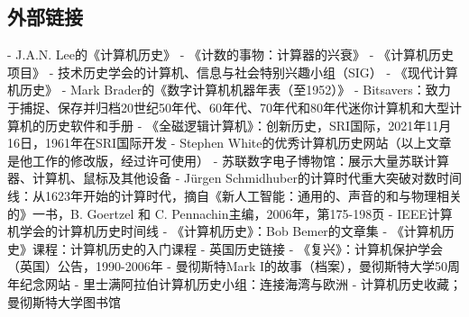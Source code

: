 \subsection{外部链接}
- J.A.N. Lee的《计算机历史》
- 《计数的事物：计算器的兴衰》
- 《计算机历史项目》
- 技术历史学会的计算机、信息与社会特别兴趣小组（SIG）
- 《现代计算机历史》
- Mark Brader的《数字计算机机器年表（至1952）》
- Bitsavers：致力于捕捉、保存并归档20世纪50年代、60年代、70年代和80年代迷你计算机和大型计算机的历史软件和手册
- 《全磁逻辑计算机》：创新历史，SRI国际，2021年11月16日，1961年在SRI国际开发
- Stephen White的优秀计算机历史网站（以上文章是他工作的修改版，经过许可使用）
- 苏联数字电子博物馆：展示大量苏联计算器、计算机、鼠标及其他设备
- Jürgen Schmidhuber的计算时代重大突破对数时间线：从1623年开始的计算时代，摘自《新人工智能：通用的、声音的和与物理相关的》一书，B. Goertzel 和 C. Pennachin主编，2006年，第175-198页
- IEEE计算机学会的计算机历史时间线
- 《计算机历史》：Bob Bemer的文章集
- 《计算机历史》课程：计算机历史的入门课程
- 英国历史链接
- 《复兴》：计算机保护学会（英国）公告，1990-2006年
- 曼彻斯特Mark I的故事（档案），曼彻斯特大学50周年纪念网站
- 里士满阿拉伯计算机历史小组：连接海湾与欧洲
- 计算机历史收藏；曼彻斯特大学图书馆